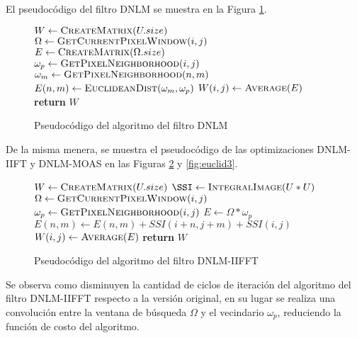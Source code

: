 El pseudoc\'odigo del filtro DNLM se muestra en la Figura \ref{fig:euclid}.

\begin{figure}[H]

\begin{algorithmic}[1]
\State $W\gets \Call{CreateMatrix}{U.size}$
		\State $\Omega\gets \Call{GetCurrentPixelWindow}{i,j}$
        \State $E\gets \Call{CreateMatrix}{\Omega.size}$
        \State $\omega_{p}\gets \Call{GetPixelNeighborhood}{i,j}$
        		\State $\omega_{m}\gets \Call{GetPixelNeighborhood}{n,m}$
                \State $E(n,m)\gets \Call{EuclideanDist}{\omega_m,\omega_p}$              
        	\EndFor 
        \EndFor 
        \State $W(i,j)\gets \Call{Average}{E}$
	\EndFor
\EndFor
\State \textbf{return} $W$
\end{algorithmic}
\caption{Pseudoc\'odigo del algoritmo del filtro DNLM}\label{fig:euclid}
\end{figure}


De la misma menera, se muestra el pseudoc\'odigo de las optimizaciones DNLM-IIFT y DNLM-MOAS en las Figuras \ref{fig:euclid2} y \ref{fig:euclid3}.

\begin{figure}[H]

\begin{algorithmic}[1]
\State $W\gets \Call{CreateMatrix}{U.size}$
\State $\SSI\gets \Call{IntegralImage}{U*U}$
		\State $\Omega\gets \Call{GetCurrentPixelWindow}{i,j}$
        \State $\omega_{p}\gets \Call{GetPixelNeighborhood}{i,j}$
        \State $E\gets \Omega * \omega_{p}$ 
        		\State $E(n,m)\gets E(n,m) + SSI(i+n,j+m) + SSI(i,j)$              
        	\EndFor 
        \EndFor 
        \State $W(i,j)\gets \Call{Average}{E}$
	\EndFor
\EndFor
\State \textbf{return} $W$
\end{algorithmic}
\caption{Pseudoc\'odigo del algoritmo del filtro DNLM-IIFFT}\label{fig:euclid2}
\end{figure}

Se observa como disminuyen la cantidad de ciclos de iteraci\'on del algoritmo del filtro DNLM-IIFFT respecto a la versi\'on original, en su lugar se realiza una convoluci\'on entre la ventana de b\'usqueda $\Omega$ y el vecindario $\omega_{p}$, reduciendo la funci\'on de costo del algoritmo. 


